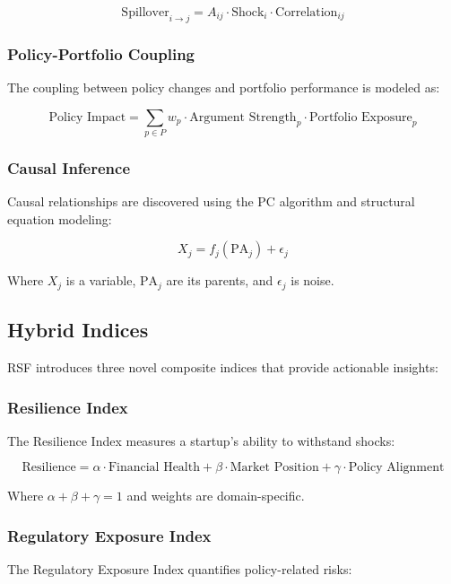 \documentclass[conference]{IEEEtran}
\begin{document}
\begin{equation}
\text{Spillover}_{i \rightarrow j} = A_{ij} \cdot \text{Shock}_i \cdot \text{Correlation}_{ij}
\end{equation}

\subsubsection{Policy-Portfolio Coupling}
The coupling between policy changes and portfolio performance is modeled as:

\begin{equation}
\text{Policy Impact} = \sum_{p \in P} w_p \cdot \text{Argument Strength}_p \cdot \text{Portfolio Exposure}_p
\end{equation}

\subsubsection{Causal Inference}
Causal relationships are discovered using the PC algorithm and structural equation modeling:

\begin{equation}
X_j = f_j(\text{PA}_j) + \epsilon_j
\end{equation}

Where $X_j$ is a variable, $\text{PA}_j$ are its parents, and $\epsilon_j$ is noise.

\subsection{Hybrid Indices}

RSF introduces three novel composite indices that provide actionable insights:

\subsubsection{Resilience Index}
The Resilience Index measures a startup's ability to withstand shocks:

\begin{equation}
\text{Resilience} = \alpha \cdot \text{Financial Health} + \beta \cdot \text{Market Position} + \gamma \cdot \text{Policy Alignment}
\end{equation}

Where $\alpha + \beta + \gamma = 1$ and weights are domain-specific.

\subsubsection{Regulatory Exposure Index}
The Regulatory Exposure Index quantifies policy-related risks:
\end{document}
